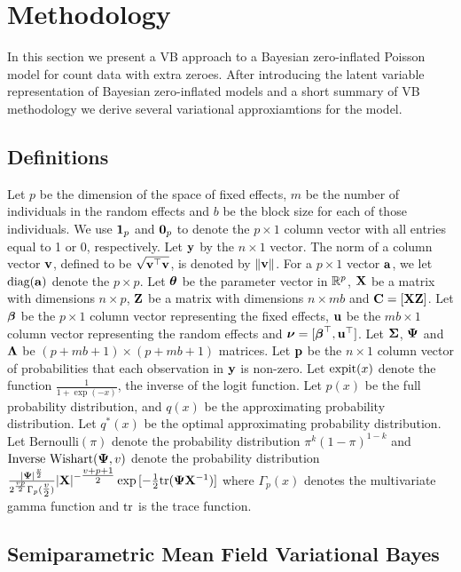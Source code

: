 \documentclass[times, doublespace]{anzsauth}
\begin{document}
\section{Methodology}
\label{sec:methodology}

In this section we present a VB approach to a Bayesian zero-inflated Poisson model for count data with extra
zeroes. After introducing the latent variable representation of Bayesian zero-inflated models and a short summary 
of VB methodology we derive several variational approxiamtions for the model.

\subsection{Definitions}

Let $p$ be the dimension of the space of fixed effects, $m$ be the number of individuals in the random effects
and $b$ be the block size for each of those individuals.
We use ${\bf 1}_p$ and ${\bf 0}_p$ to denote the $p \times 1$ column vector with all entries equal to 1 or 0,
respectively.
Let ${\bf y}$ by the $n \times 1$ vector.
The norm of a column vector ${\bf v}$, defined to be $\sqrt{{\bf v}^\top {\bf v}}$, is denoted by $\|{\bf v}\|$.
For a $p \times 1$ vector ${\bf a}$, we let $\text{diag}{({\bf a})}$ denote the $p \times p$.
Let ${\boldsymbol \theta}$ be the parameter vector in ${\mathbb{R}}^p$,
${\bf X}$ be a matrix with dimensions $n \times p$,
${\bf Z}$ be a matrix with dimensions $n \times m b$
and ${\bf C} = [ {\bf X} {\bf Z} ]$.
Let ${\boldsymbol \beta}$ be the $p \times 1$ column vector representing the fixed effects,
${\bf u}$ be the $m b \times 1$ column vector representing the random effects
and ${\boldsymbol \nu} = [{\boldsymbol \beta}^\top, {\bf u}^\top]$.
Let ${\boldsymbol \Sigma}$, ${\boldsymbol \Psi}$ and ${\boldsymbol \Lambda}$ be $(p + m b + 1) \times (p + m b + 1)$ matrices.
Let ${\bf p}$ be the $n \times 1$ column vector of probabilities that each observation in ${\bf y}$ is non-zero.
Let $\text{expit} (x)$ denote the function $\tfrac{1}{1 + \exp(-x)}$, the inverse of the logit function.
Let $p(x)$ be the full probability distribution, and $q(x)$ be the approximating probability distribution.
Let $q^*(x)$ be the optimal approximating probability distribution.
Let $\text{Bernoulli}(\pi)$  denote the probability distribution $\pi^k (1 - \pi)^{1-k}$
and $\text{Inverse Wishart}({\boldsymbol \Psi}, v)$ denote the probability distribution
$\tfrac{|{\boldsymbol \Psi}|^\frac{v}{2}}{2^{\frac{vp}{2}} \Gamma_p{(\tfrac{v}{2})}} |{\bf X}|^{-\tfrac{v + p + 1}{2}} \exp{[- \tfrac{1}{2} \text{tr}{({\boldsymbol\Psi}{\bf X}^{-1})}]}$ where $\Gamma_p{(x)}$ denotes the multivariate gamma function and
$\text{tr}$ is the trace function.


\subsection{Semiparametric Mean Field Variational Bayes}
\end{document}
